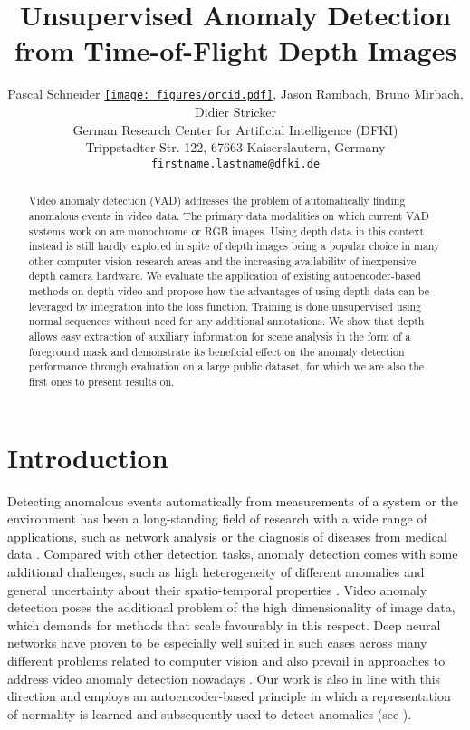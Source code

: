 \documentclass[10pt,twocolumn,letterpaper]{article}
\begin{document}
\title{Unsupervised Anomaly Detection from Time-of-Flight Depth Images}

\author{Pascal Schneider \href{https://orcid.org/0000-0002-0555-2694}{\texttt{[image: figures/orcid.pdf]}}, Jason Rambach, Bruno Mirbach, Didier Stricker\\
German Research Center for Artificial Intelligence (DFKI)\\
Trippstadter Str. 122, 67663 Kaiserslautern, Germany\\
{\tt\small firstname.lastname@dfki.de}}
\maketitle

\begin{abstract}
   Video anomaly detection (VAD) addresses the problem of automatically finding anomalous events in video data. The primary data modalities on which current VAD systems work on are monochrome or RGB images. Using depth data in this context instead is still hardly explored in spite of depth images being a popular choice in many other computer vision research areas and the increasing availability of inexpensive depth camera hardware. We evaluate the application of existing autoencoder-based methods on depth video and propose how the advantages of using depth data can be leveraged by integration into the loss function. Training is done unsupervised using normal sequences without need for any additional annotations. We show that depth allows easy extraction of auxiliary information for scene analysis in the form of a foreground mask and demonstrate its beneficial effect on the anomaly detection performance through evaluation on a large public dataset, for which we are also the first ones to present results on. 
\end{abstract}

\section{Introduction} \label{sec:intro}
Detecting anomalous events automatically from measurements of a system or the environment has been a long-standing field of research with a wide range of applications, such as network analysis \cite{ad_in_network_analysis} or the diagnosis of diseases from medical data \cite{ad_for_brain_mri}. Compared with other detection tasks, anomaly detection comes with some additional challenges, such as high heterogeneity of different anomalies and general uncertainty about their spatio-temporal properties \cite{dl_for_ad_review}. Video anomaly detection poses the additional problem of the high dimensionality of image data, which demands for methods that scale favourably in this respect. Deep neural networks have proven to be especially well suited in such cases across many different problems related to computer vision and also prevail in approaches to address video anomaly detection nowadays \cite{dl_for_vad_review}. Our work is also in line with this direction and employs an autoencoder-based principle in which a representation of normality is learned and subsequently used to detect anomalies (see ).
\end{document}
